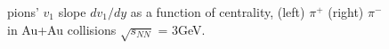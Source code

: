 \begin{figure}[h]
\centering
{}
\caption{\label{pion_dv1dy_cent} pions' $v_{1}$ slope $dv_{1}/dy$ as a function of centrality, (left) $\pi^{+}$ (right) $\pi^{-}$ in Au+Au collisions $\sqrt{s_{NN}}$ = 3GeV.}
\end{figure}

